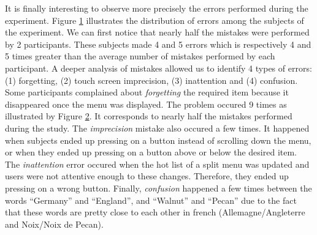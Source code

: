 \begin{figure}[!ht]
    
    \label{fig:errors_participants}
\end{figure}

It is finally interesting to observe more precisely the errors performed during 
the experiment. Figure \ref{fig:errors_participants} 
illustrates the distribution of errors among the subjects of the 
experiment. We can first notice that nearly half the mistakes were 
performed by 2 participants. These subjects made 4 and 5 errors 
which is respectively 4 and 5 times greater than the average number of 
mistakes performed by each participant. A deeper analysis of mistakes 
allowed us to identify 4 types of errors: (1) forgetting, (2) touch screen 
imprecision, (3) inattention and (4) confusion. Some participants complained 
about \textit{forgetting} the required item because it disappeared once the menu 
was displayed. The problem occured 9 times as illustrated by Figure 
\ref{fig:errors_types}. It corresponds to nearly half the mistakes performed 
during the study. The \textit{imprecision} mistake also occured a few times. It 
happened when subjects ended up pressing on a button instead of scrolling down 
the menu, or when they ended up pressing on a button above or below the 
desired item. The \textit{inattention} error occured when 
the hot list of a split menu was updated and users were not attentive enough to 
these changes. Therefore, they ended up pressing on a wrong button. Finally, 
\textit{confusion} happened a few times between the words \enquote{Germany} and 
\enquote{England}, and \enquote{Walnut} and \enquote{Pecan} due to the fact that 
these words are pretty close to each other in french (Allemagne/Angleterre and 
Noix/Noix de Pecan).

\begin{figure}[!ht]
    
    \label{fig:errors_types}
\end{figure}

